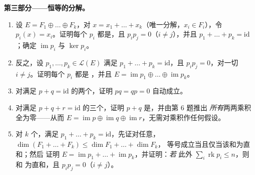 \begin{problem}
\medskip
\noindent\textbf{第三部分——恒等的分解。}
\begin{enumerate}[resume]
  \item 设 $E = F_1 \oplus \dots \oplus F_k$，对 $x = x_1 +
        \dots + x_k$（唯一分解，$x_i \in F_i$），令
        $p_i(x) = x_i$。证明每个 $p_i$ 都是，且
        $p_i p_j = 0$（$i \neq j$），并且 $p_1 + \dots + p_k
        = \mathrm{id}$；确定 $\operatorname{im} p_i$ 与
        $\ker p_i$。
  \item 反之，设 $p_1, \dots, p_k \in \mathcal{L}(E)$
        满足 $p_1 + \dots + p_k = \mathrm{id}$，且 $p_i p_j =
        0$，对一切 $i \neq j$。证明每个 $p_i$ 都是
        ，并且 $E = \operatorname{im} p_1 \oplus
        \dots \oplus \operatorname{im} p_k$。
  \item 对满足 $p + q = \mathrm{id}$ 的两个，证明 $pq
        = qp = 0$ 自动成立。
  \item 对满足 $p + q + r = \mathrm{id}$ 的三个，证明
        $p + q$ 是，并由第 6 题推出
        \emph{所有}两两乘积全为零——从而 $E =
        \operatorname{im} p \oplus \operatorname{im} q \oplus
        \operatorname{im} r$，无需对乘积作任何假设。
  \item 对 $k$ 个，满足 $p_1 + \dots + p_k =
        \mathrm{id}$，先证对任意，$\dim
        (F_1 + \dots + F_k) \leq \dim F_1 + \dots + \dim F_k$，
        等号成立当且仅当该和为直和；然后
        证明 $E = \operatorname{im} p_1 + \dots +
        \operatorname{im} p_k$，并证明：\emph{若}
        此外 $\sum_i \operatorname{rk} p_i \leq n$，则和
        为直和，且 $p_i p_j = 0$（$i \neq j$）。
\end{enumerate}


\end{problem}
